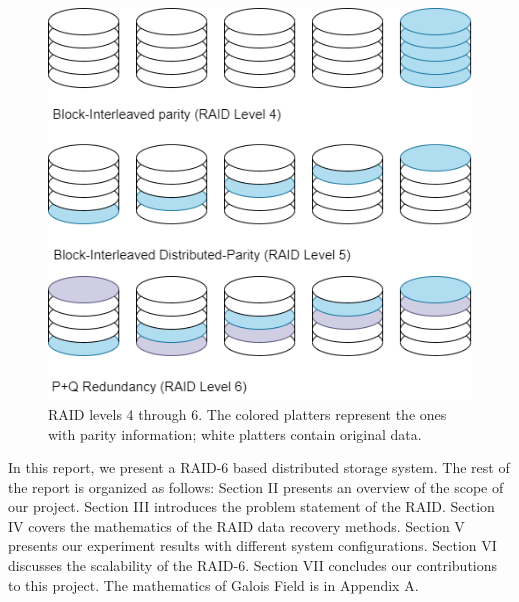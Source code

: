 \documentclass[journal]{IEEEtran}
\begin{document}
\begin{figure}[htbp]
  \centering
  \includegraphics[width=0.9\linewidth]{Images/RAID4-6.drawio.png}
  \caption{RAID levels 4 through 6. The colored platters represent the ones with parity information; white platters contain original data.}
  \label{fig:RAID4-6}
\end{figure}

In this report, we present a RAID-6 based distributed storage system. The rest of the report is organized as follows: Section II presents an overview of the scope of our project. Section III introduces the problem statement of the RAID. Section IV covers the mathematics of the RAID data recovery methods. Section V presents our experiment results with different system configurations. Section VI discusses the scalability of the RAID-6. Section VII concludes our contributions to this project. The mathematics of Galois Field is in Appendix A.
\end{document}
